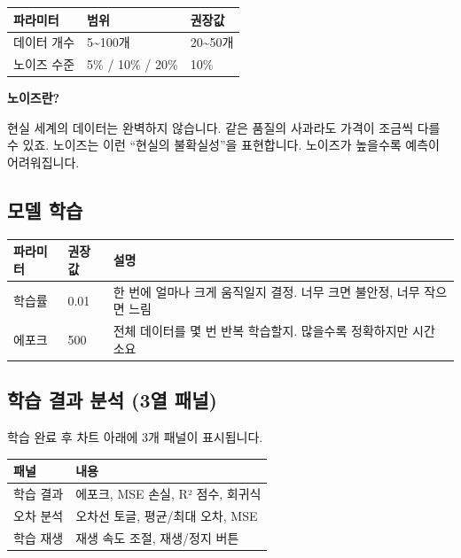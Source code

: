 \documentclass[11pt,a4paper]{article}
\begin{document}
\begin{center}
\begin{tabular}{lll}
\toprule
\textbf{파라미터} & \textbf{범위} & \textbf{권장값} \\
\midrule
데이터 개수 & 5\textasciitilde100개 & 20\textasciitilde50개 \\
노이즈 수준 & 5\% / 10\% / 20\% & 10\% \\
\bottomrule
\end{tabular}
\end{center}

\begin{tipbox}
\textbf{노이즈란?}

현실 세계의 데이터는 완벽하지 않습니다. 같은 품질의 사과라도 가격이 조금씩 다를 수 있죠.
노이즈는 이런 ``현실의 불확실성''을 표현합니다. 노이즈가 높을수록 예측이 어려워집니다.
\end{tipbox}

\subsection{모델 학습}

\begin{center}
\begin{tabular}{llp{6cm}}
\toprule
\textbf{파라미터} & \textbf{권장값} & \textbf{설명} \\
\midrule
학습률 & 0.01 & 한 번에 얼마나 크게 움직일지 결정. 너무 크면 불안정, 너무 작으면 느림 \\
에포크 & 500 & 전체 데이터를 몇 번 반복 학습할지. 많을수록 정확하지만 시간 소요 \\
\bottomrule
\end{tabular}
\end{center}

\subsection{학습 결과 분석 (3열 패널)}

학습 완료 후 차트 아래에 3개 패널이 표시됩니다.

\begin{center}
\begin{tabular}{|l|p{8cm}|}
\hline
\rowcolor{bgblue}
\textbf{패널} & \textbf{내용} \\
\hline
학습 결과 & 에포크, MSE 손실, R² 점수, 회귀식 \\
\hline
오차 분석 & 오차선 토글, 평균/최대 오차, MSE \\
\hline
학습 재생 & 재생 속도 조절, 재생/정지 버튼 \\
\hline
\end{tabular}
\end{center}
\end{document}
